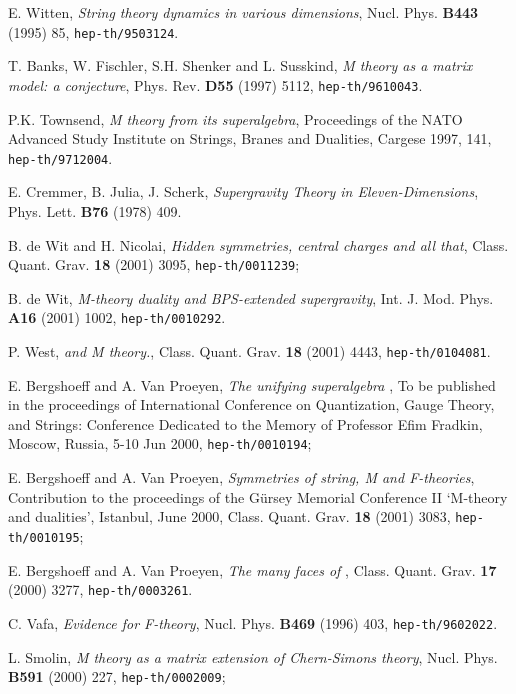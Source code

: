 \documentclass[a4paper,11pt]{article}
\begin{document}
\begin{thebibliography}{99}

E. Witten, {\it String theory dynamics in various dimensions},
Nucl. Phys. {\bf B443} (1995) 85, {\tt hep-th/9503124}.

T. Banks, W. Fischler, S.H. Shenker and L. Susskind,
{\it M theory as a matrix model: a conjecture},
Phys. Rev. {\bf D55} (1997) 5112, {\tt hep-th/9610043}.

P.K. Townsend, {\it M theory from its superalgebra},
Proceedings of the NATO Advanced Study Institute on Strings, 
Branes and Dualities, Cargese 1997, 141, {\tt hep-th/9712004}.

E. Cremmer, B. Julia, J. Scherk, {\it Supergravity Theory in Eleven-Dimensions},
Phys. Lett. {\bf B76} (1978) 409.

B. de Wit and H. Nicolai, {\it Hidden symmetries, central charges and all that}, 
Class. Quant. Grav. {\bf 18} (2001) 3095, {\tt hep-th/0011239};

B. de Wit, {\it M-theory duality and BPS-extended supergravity},
Int. J. Mod. Phys. {\bf A16} (2001) 1002, {\tt hep-th/0010292}.

P. West, {\it {}\coordHE{} and M theory.}, 
Class. Quant. Grav. {\bf 18} (2001) 4443, {\tt hep-th/0104081}.

E. Bergshoeff and A. Van Proeyen, {\it The unifying superalgebra \coordHE{}},
To be published in the proceedings of International Conference on Quantization, 
Gauge Theory, and Strings: Conference Dedicated to the Memory of Professor Efim Fradkin, 
Moscow, Russia, 5-10 Jun 2000, {\tt hep-th/0010194};

E. Bergshoeff and A. Van Proeyen, {\it Symmetries of string, M and F-theories},
Contribution to the proceedings of the G\"ursey Memorial Conference II `M-theory and dualities', Istanbul, June 2000,
Class. Quant. Grav. {\bf 18} (2001) 3083, {\tt hep-th/0010195};

E. Bergshoeff and A. Van Proeyen, {\it The many faces of \coordHE{}},
Class. Quant. Grav. {\bf 17} (2000) 3277, {\tt hep-th/0003261}.

C. Vafa, {\it Evidence for F-theory}, Nucl. Phys. {\bf B469} (1996) 403,
{\tt hep-th/9602022}.

L. Smolin, {\it {\cal M} theory as a matrix extension of Chern-Simons theory},
Nucl. Phys. {\bf B591} (2000) 227, {\tt hep-th/0002009};


\end{thebibliography}
\end{document}
